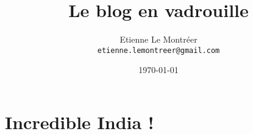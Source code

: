 \documentclass[a5paper, 10pt]{book}
\begin{document}
\frontmatter
\title{Le blog en vadrouille}
\author{Etienne Le Montr\'eer\\
  \texttt{etienne.lemontreer@gmail.com}}
\date{\today}

\maketitle

\tableofcontents

\mainmatter

\chapter{Incredible India !}

\pagebreak
\pagebreak
\pagebreak
\pagebreak
\pagebreak
\pagebreak
\pagebreak
\pagebreak
\pagebreak
\pagebreak
\pagebreak

%

%
\end{document}
